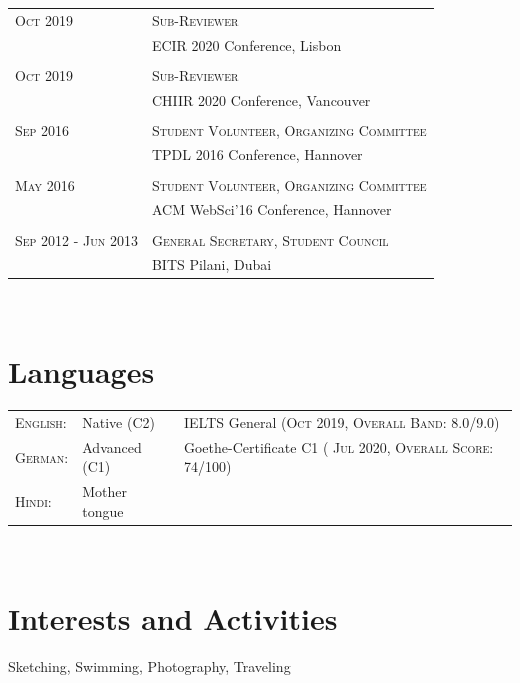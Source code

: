 \documentclass[a4paper,10pt]{article} %
\begin{document}
\begin{tabular}{ll}
\textsc{Oct 2019} & \textsc{Sub-Reviewer}\\
& ECIR 2020 Conference, Lisbon\\
\\
\textsc{Oct 2019} & \textsc{Sub-Reviewer}\\
& CHIIR 2020 Conference, Vancouver\\
\\
\textsc{Sep 2016} & \textsc{Student Volunteer, Organizing Committee}\\
& TPDL 2016 Conference, Hannover\\
\\
\textsc{May 2016} & \textsc{Student Volunteer, Organizing Committee}\\
& ACM WebSci'16 Conference, Hannover\\
\\
\textsc{Sep 2012 - Jun 2013} & \textsc{General Secretary, Student Council}\\
& BITS Pilani, Dubai\\
\end{tabular}
\\

\section{Languages}

\begin{tabular}{lll}
\textsc{English:} & Native (C2) & IELTS General (\textsc{Oct 2019, Overall Band: 8.0/9.0})\\

\textsc{German:} & Advanced (C1) & Goethe-Certificate C1 ( \textsc{Jul 2020, Overall Score: 74/100})\\

\textsc{Hindi:} & Mother tongue &\\
\end{tabular}
\\

\section{Interests and Activities}

Sketching, Swimming, Photography, Traveling
\end{document}
